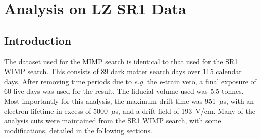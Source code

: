 \section{Analysis on LZ SR1 Data}
\subsection{Introduction}

The dataset used for the MIMP search is identical to that used for the SR1 WIMP search\cite{aalbers_first_2022}.
This consists of 89 dark matter search days over 115 calendar days.
After removing time periods due to \textit{e.g.} the e-train veto, a final exposure of 60 live days was used for the result.
The fiducial volume used was 5.5 tonnes.
Most importantly for this analysis, the maximum drift time was 951~$\mu$s, with an electron lifetime in excess of 5000~$\mu$s, and a drift field of 193~V/cm.
Many of the analysis cuts were maintained from the SR1 WIMP search, with some modifications, detailed in the following sections.

